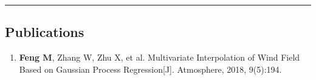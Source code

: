 \documentclass[10pt,letterpaper]{article}
\makeatletter
\newcommand{\headerrow}[2]
{\begin{tabular*}{\linewidth}{l@{\extracolsep{\fill}}r}
	#1 &
	#2 \\
\end{tabular*}}
\makeatother
\begin{document}
%
%

\hrule
\vspace{-0.4em}
\subsection*{Publications}

\begin{enumerate}
	\parskip=0.1em
	
	\item \textbf{Feng M}, Zhang W, Zhu X, et al. Multivariate Interpolation of Wind Field Based on Gaussian Process Regression[J]. Atmosphere, 2018, 9(5):194.
	
%	

\end{enumerate}

%
%	
%	
%		
%	
%
\end{document}
